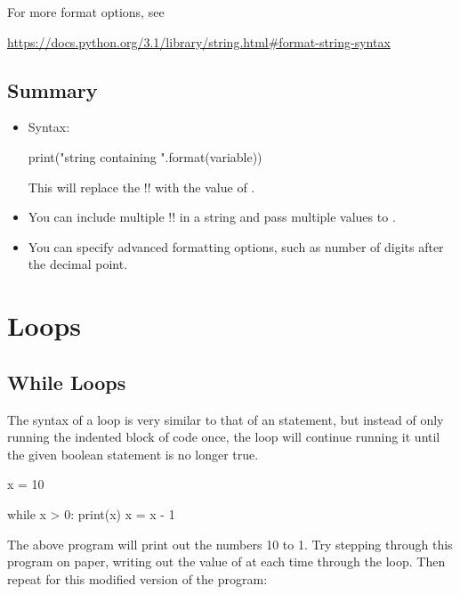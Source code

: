 \documentclass[11pt]{cselabheader}
\begin{document}
For more format options, see
\begin{center}
  \vspace{-2mm}
\url{https://docs.python.org/3.1/library/string.html#format-string-syntax}
\vspace{-2mm}

\end{center}

\subsection{Summary}

\begin{itemize}
  \item Syntax:
    \begin{python3code}
print("string containing {}".format(variable))
    \end{python3code}
    
    This will replace the \pythoninline!{}! with the value of .
    
  \item You can include multiple \pythoninline!{}! in a string and pass multiple values to .

  \item You can specify advanced formatting options, such as number of digits after the decimal point.
\end{itemize}

\pagebreak
\section{Loops}

\subsection{While Loops}
The syntax of a  loop is very similar to that of an
 statement, but instead of only running the indented block of code
once, the  loop will continue running it until the given
boolean statement is no longer true.

\begin{python3code}
x = 10

while x > 0:
    print(x)
    x = x - 1
\end{python3code}

The above program will print out the numbers 10 to 1. Try stepping through this
program on paper, writing out the value of  at each time through
the loop. Then repeat for this modified version of the program:
\end{document}
